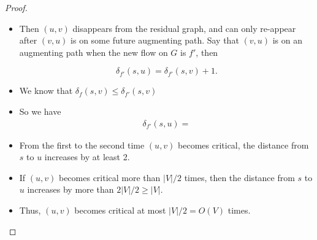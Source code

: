 \documentclass[11  pt]{article}
\begin{document}
\begin{proof}
\begin{itemize}
		\textit{Because they are on a shortest path} \\
		
		\item Then $(u,v)$ disappears from the residual graph, and can only re-appear after $(v,u)$ is on some future augmenting path. Say that $(v,u)$ is on an augmenting path when the new flow on $G$ is $f'$, then 
		
		\begin{equation*}
			\delta_{f'}(s,u) = \delta_{f'}(s,v) + 1.
		\end{equation*}
		
		
		\item We know that $\delta_f(s,v) \leq \delta_{f'}(s,v)$ \\ %
		
		\item So we have
		\begin{align*}
			\delta_{f'}(s,u) =  %
		\end{align*}
		
		\item From the first to the second time $(u,v)$ becomes critical, the distance from $s$ to $u$ increases by at least 2.\\
		
		
		\item If $(u,v)$ becomes critical more than $|V|/2$ times, then the distance from $s$ to $u$ increases by more than $2 |V|/2 \geq |V|$.\\
		
		\vs{2cm}
		
		\item Thus, $(u,v)$ becomes critical at most $|V|/2 = O(V)$ times.
	\end{itemize}
\end{proof}
\end{document}
